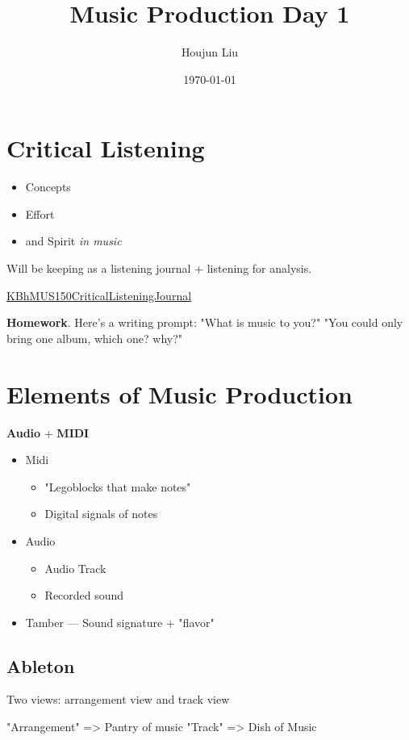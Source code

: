 \documentclass[letterpaper]{article}
\author{Houjun Liu}
\date{\today}
\title{Music Production Day 1}
\renewcommand{\tableofcontents}{}
\begin{document}
\tableofcontents



\section{Critical Listening}
\label{sec:orgdaa9add}
\begin{itemize}
\item Concepts
\item Effort
\item and Spirit \emph{in music}
\end{itemize}

Will be keeping as a listening journal + listening for analysis.

\href{KBhMUS150CriticalListeningJournal.org}{KBhMUS150CriticalListeningJournal}

\textbf{Homework}. Here's a writing prompt: "What is music to you?" "You could
only bring one album, which one? why?"

\section{Elements of Music Production}
\label{sec:org05132a2}
\textbf{Audio} + \textbf{MIDI}

\begin{itemize}
\item Midi

\begin{itemize}
\item "Legoblocks that make notes"
\item Digital signals of notes
\end{itemize}

\item Audio

\begin{itemize}
\item Audio Track
\item Recorded sound
\end{itemize}

\item Tamber --- Sound signature + "flavor"
\end{itemize}

\subsection{Ableton}
\label{sec:orgef46ea0}
Two views: arrangement view and track view

"Arrangement" => Pantry of music "Track" => Dish of Music
\end{document}
